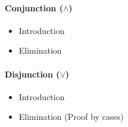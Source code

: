 \paragraph{Conjunction ($\land$)}
\begin{itemize}
    \item Introduction
    \begin{prooftree}
    \end{prooftree}
    \item Elimination
    \noindent
      \begin{minipage}[t]{0.5\textwidth}
        \begin{prooftree}
        \end{prooftree}
      \end{minipage}\hfill
      \begin{minipage}[t]{0.5\textwidth}
        \begin{prooftree}
        \end{prooftree}
      \end{minipage}
\end{itemize}
\paragraph{Disjunction ($\lor$)}
\begin{itemize}
    \item Introduction
          \begin{minipage}[t]{0.5\textwidth}
    \begin{prooftree}
    \end{prooftree}
      \end{minipage}\hfill
      \begin{minipage}[t]{0.5\textwidth}
    \begin{prooftree}
    \end{prooftree}
      \end{minipage}
    \item Elimination (Proof by cases)
    \begin{prooftree}
    \end{prooftree}
\end{itemize}
